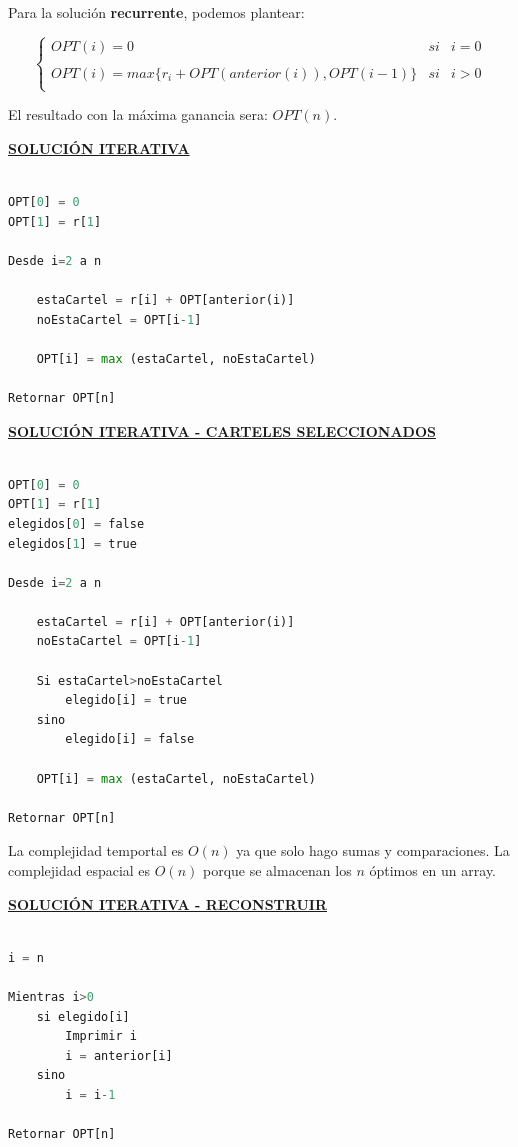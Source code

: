 \documentclass{article}
\begin{document}
Para la solución \textbf{recurrente}, podemos plantear:

\[
    \left\{ \begin{array}{lcc}
        OPT(i) = 0 &   si  & i = 0 \\
        \\ OPT(i) = max\{r_i + OPT(anterior(i)), OPT(i-1) \} &  si & i > 0 \\
        \end{array}
    \right.
\]

El resultado con la máxima ganancia sera: \(OPT(n)\). 

\noindent
\textbf{\underline{SOLUCIÓN ITERATIVA}}

\begin{lstlisting}[language=Python, caption=Solución iterativa]

OPT[0] = 0
OPT[1] = r[1]

Desde i=2 a n

    estaCartel = r[i] + OPT[anterior(i)]
    noEstaCartel = OPT[i-1]

    OPT[i] = max (estaCartel, noEstaCartel)

Retornar OPT[n]
\end{lstlisting}


\noindent
\textbf{\underline{SOLUCIÓN ITERATIVA - CARTELES SELECCIONADOS}}

\begin{lstlisting}[language=Python, caption=Solución iterativa con reconstrucción]

OPT[0] = 0
OPT[1] = r[1]
elegidos[0] = false
elegidos[1] = true

Desde i=2 a n

    estaCartel = r[i] + OPT[anterior(i)]
    noEstaCartel = OPT[i-1]

    Si estaCartel>noEstaCartel 
        elegido[i] = true
    sino
        elegido[i] = false

    OPT[i] = max (estaCartel, noEstaCartel)

Retornar OPT[n]
\end{lstlisting}


La complejidad temportal es \(O(n)\) ya que solo hago sumas y comparaciones. La complejidad espacial
es \(O(n)\) porque se almacenan los \(n\) óptimos en un array.

\noindent
\textbf{\underline{SOLUCIÓN ITERATIVA - RECONSTRUIR}}

\begin{lstlisting}[language=Python, caption=Solución iterativa]

i = n

Mientras i>0
    si elegido[i]
        Imprimir i
        i = anterior[i]
    sino 
        i = i-1

Retornar OPT[n]
\end{lstlisting}
\end{document}
